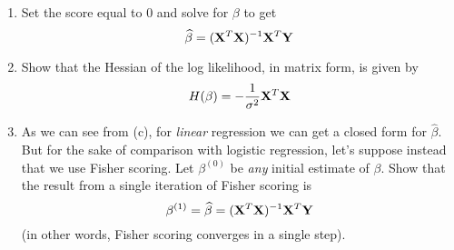 \documentclass[11pt]{article}
\begin{document}
\begin{enumerate}
\begin{enumerate}
\item Set the score equal to 0 and solve for $\beta$ to get
$$\widehat{\beta} = ({\bf X}^T {\bf X})^{-1} {\bf X}^T {\bf Y}$$

\item Show that the Hessian of the log likelihood, in matrix form, is given by
$$H(\beta) = -\frac{1}{\sigma^2} {\bf X}^T {\bf X}$$

\item As we can see from (c), for \textit{linear} regression we can get a closed form for $\widehat{\beta}$. But for the sake of comparison with logistic regression, let's suppose instead that we use Fisher scoring. Let $\beta^{(0)}$ be \textit{any} initial estimate of $\beta$. Show that the result from a single iteration of Fisher scoring is
$$\beta^{(1)} = \widehat{\beta} = ({\bf X}^T {\bf X})^{-1} {\bf X}^T {\bf Y}$$
(in other words, Fisher scoring converges in a single step).
\end{enumerate}

\end{enumerate}
\end{document}
